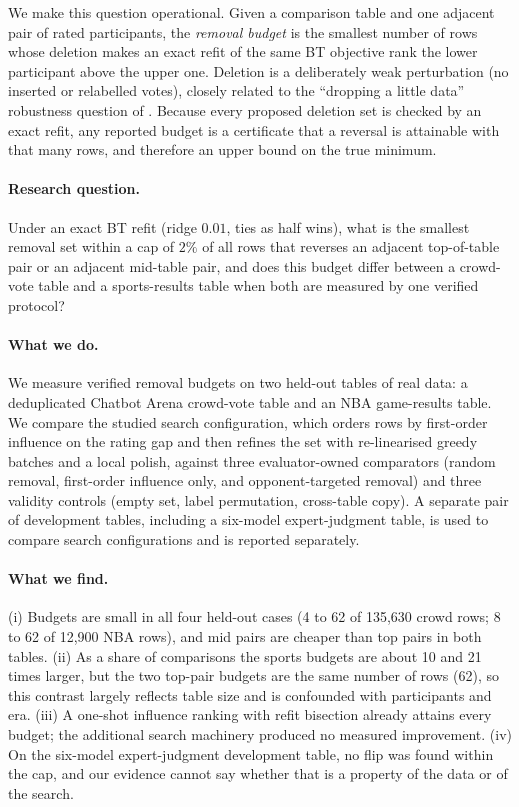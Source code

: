 \documentclass{article}
\begin{document}
We make this question operational. Given a comparison table and one adjacent pair of rated participants, the \emph{removal budget} is the smallest number of rows whose deletion makes an exact refit of the same BT objective rank the lower participant above the upper one. Deletion is a deliberately weak perturbation (no inserted or relabelled votes), closely related to the ``dropping a little data'' robustness question of \citet{Broderick2020AnAF}. Because every proposed deletion set is checked by an exact refit, any reported budget is a certificate that a reversal is attainable with that many rows, and therefore an upper bound on the true minimum.

\paragraph{Research question.} Under an exact BT refit (ridge $0.01$, ties as half wins), what is the smallest removal set within a cap of $2\%$ of all rows that reverses an adjacent top-of-table pair or an adjacent mid-table pair, and does this budget differ between a crowd-vote table and a sports-results table when both are measured by one verified protocol?

\paragraph{What we do.} We measure verified removal budgets on two held-out tables of real data: a deduplicated Chatbot Arena crowd-vote table and an NBA game-results table. We compare the studied search configuration, which orders rows by first-order influence on the rating gap and then refines the set with re-linearised greedy batches and a local polish, against three evaluator-owned comparators (random removal, first-order influence only, and opponent-targeted removal) and three validity controls (empty set, label permutation, cross-table copy). A separate pair of development tables, including a six-model expert-judgment table, is used to compare search configurations and is reported separately.

\paragraph{What we find.} (i) Budgets are small in all four held-out cases (4 to 62 of 135,630 crowd rows; 8 to 62 of 12,900 NBA rows), and mid pairs are cheaper than top pairs in both tables. (ii) As a share of comparisons the sports budgets are about 10 and 21 times larger, but the two top-pair budgets are the same number of rows (62), so this contrast largely reflects table size and is confounded with participants and era. (iii) A one-shot influence ranking with refit bisection already attains every budget; the additional search machinery produced no measured improvement. (iv) On the six-model expert-judgment development table, no flip was found within the cap, and our evidence cannot say whether that is a property of the data or of the search.
\end{document}
